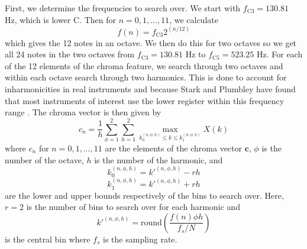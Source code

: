 \documentclass[journal]{IEEEtran}
\begin{document}
First, we determine the frequencies to search over.
We start with $f_{\text{C}3} = 130.81$ Hz, which is lower C.
Then for $n = 0, 1, \ldots, 11$, we calculate
\begin{equation}
    f(n) = f_{\text{C}3}2^{(n / 12)}
    \label{eq:freq}
\end{equation}
which gives the 12 notes in an octave.
We then do this for two octaves so we get all 24 notes in the two octaves from $f_{\text{C}3} = 130.81$ Hz to $f_{\text{C}5} = 523.25$ Hz.
For each of the 12 elements of the chroma feature, we search through two octaves and within each octave search through two harmonics.
This is done to account for inharmonicities in real instruments and because Stark and Plumbley have found that most instruments of interest use the lower register within this frequency range \cite{stark}.
The chroma vector is then given by
\begin{equation}
    c_n = \frac{1}{h}\sum_{\phi = 1}^2\sum_{h = 1}^2 \max_{k_0^{(n, \phi, h)} \leq k \leq k_1^{(n, \phi, h)}} X(k)
    \label{eq:chroma}
\end{equation}
where $c_n$ for $n = 0, 1, \ldots, 11$ are the elements of the chroma vector $\mathbf{c}$, $\phi$ is the number of the octave, $h$ is the number of the harmonic, and 
\begin{equation*}
    k_0^{(n, \phi, h)} = k'^{(n, \phi, h)} - rh
\end{equation*}
\begin{equation*}
    k_1^{(n, \phi, h)} = k'^{(n, \phi, h)} + rh
\end{equation*}
are the lower and upper bounds respectively of the bins to search over. Here, $r = 2$ is the number of bins to search over for each harmonic and 
\begin{equation*}
    k'^{(n, \phi, h)} = \text{round}\!\left(\frac{f(n)\phi h}{f_s / N}\right)
\end{equation*}
is the central bin where $f_s$ is the sampling rate.
\end{document}
